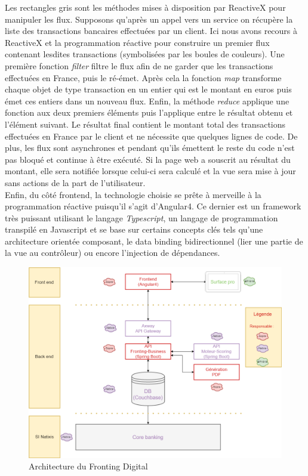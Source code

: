 	Les rectangles gris sont les méthodes mises à disposition par ReactiveX pour manipuler les flux. Supposons qu'après un appel vers un service on récupère la liste des transactions bancaires effectuées par un client. Ici nous avons recours à ReactiveX et la programmation réactive pour construire un premier flux contenant lesdites transactions (symbolisées par les boules de couleurs). Une première fonction \textit{filter} filtre le flux afin de ne garder que les transactions effectuées en France, puis le ré-émet. Après cela la fonction \textit{map} transforme chaque objet de type transaction en un entier qui est le montant en euros puis émet ces entiers dans un nouveau flux. Enfin, la méthode \textit{reduce} applique une fonction aux deux premiers éléments puis l'applique entre le résultat obtenu et l'élément suivant. Le résultat final contient le montant total des transactions effectuées en France par le client et ne nécessite que quelques lignes de code. De plus, les flux sont asynchrones et pendant qu'ils émettent le reste du code n'est pas bloqué et continue à être exécuté. Si la page web a souscrit au résultat du montant, elle sera notifiée lorsque celui-ci sera calculé et la vue sera mise à jour sans actions de la part de l'utilisateur. \\

	Enfin, du côté frontend, la technologie choisie se prête à merveille à la programmation réactive puisqu'il s'agit d'Angular4. Ce dernier est un framework très puissant utilisant le langage \textit{Typescript}, un langage de programmation transpilé en Javascript et se base sur certains concepts clés tels qu'une architecture orientée composant, le data binding bidirectionnel (lier une partie de la vue au contrôleur) ou encore l'injection de dépendances.

\begin{figure}[h!]
	\includegraphics[scale=0.50]{images/travailBP1818/architecture/archiFonc.png}
	\centering
	\caption{Architecture du Fronting Digital}
	\label{archiFoncBP1818}
\end{figure}

